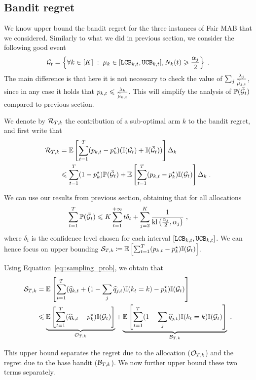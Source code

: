 \subsection{Bandit regret}

We know upper bound the bandit regret for the three instances of Fair MAB that we considered. Similarly to what we did in previous section, we consider the following good event
 \[\mathcal{G}_t=\left\{ \forall k \in [K]\;:\; \mu_k \in [\texttt{LCB}_{k, t}, \texttt{UCB}_{k, t}], N_k(t)\geqslant \frac{\alpha_j}{2} \right\}\;.\]
 The main difference is that here it is not necessary to check the value of $\sum_j \frac{\lambda_j}{\widetilde{\mu}_{j,t}}$, since in any case it holds that $p_{k,t}\leqslant \frac{\lambda_k}{\widetilde{\mu}_{k,t}}$. This will simplify the analysis of $\mathbb{P}(\bar {\mathcal{G}}_t)$ compared to previous section.

We denote by $\mathcal{R}_{T,k}$ the contribution of a sub-optimal arm $k$ to the bandit regret, and first write that 
\begin{align*}
\mathcal{R}_{T,k} &= \mathbb{E}\left[\sum_{t=1}^T (p_{k,t} - p^\star_k)(\mathbb{I}(\mathcal{G}_t)+\mathbb{I}(\bar {\mathcal{G}}_t))\right]\Delta_k \\
& \leqslant \sum_{t=1}^T (1-p_k^\star) \mathbb{P}(\bar {\mathcal{G}}_t) + \mathbb{E}\left[\sum_{t=1}^T (p_{k,t} - p_k^\star)\mathbb{I}(\mathcal{G}_t)\right] \Delta_k \;.
\end{align*}

We can use our results from previous section, obtaining that for all allocations 
\[\sum_{t=1}^T \mathbb{P}(\bar {\mathcal{G}}_t) \leqslant K \sum_{t=1}^{+\infty} t\delta_t + \sum_{j=2}^K\frac{1}{\text{\normalfont kl}\left(\frac{\alpha_j}{2}, \alpha_j\right)}\;, \]
where $\delta_t$ is the confidence level chosen for each interval $[\texttt{LCB}_{k,t}, \texttt{UCB}_{k,t}]$. We can hence focus on upper bounding $\mathcal{S}_{T, k} \coloneqq \mathbb{E}\left[\sum_{t=1}^T (p_{k,t} - p_k^\star)\mathbb{I}(\mathcal{G}_t)\right]$. 

Using Equation~\eqref{eq::sampling_prob}, we obtain that 
\begin{align*}\mathcal{S}_{T,k} &= \mathbb{E}\left[\sum_{t=1}^T (\widehat{q}_{k, t} + (1-\sum_j \widehat{q}_{j, t}) \mathbb{I}(k_t=k) - p_k^\star)\mathbb{I}(\mathcal{G}_t)\right] \\
& \leqslant   \underbrace{\mathbb{E}\left[\sum_{t=1}^T (\widehat{q}_{k, t}-p_k^\star) \mathbb{I}(\mathcal{G}_t)\right]}_{\mathcal{O}_{ T,k}} + \underbrace{\mathbb{E}\left[\sum_{t=1}^T (1-\sum_j \widehat{q}_{j, t}) \mathbb{I}(k_t=k)\mathbb{I}(\mathcal{G}_t)\right]}_{\mathcal{B}_{T,k}} \;.
\end{align*}

This upper bound separates the regret due to the allocation ($\mathcal{O}_{T,k}$) and the regret due to the base bandit ($\mathcal{B}_{T,k}$). We now further upper bound these two terms separately.

